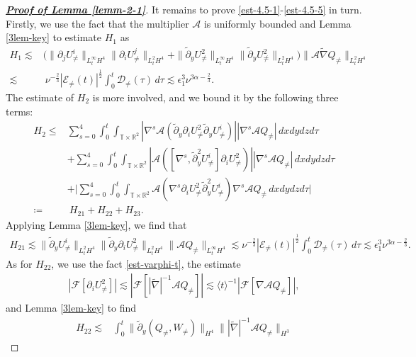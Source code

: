 \documentclass[11pt,reqno]{article}
\numberwithin{equation}{section}
\newcommand\R{{\mathbb R}}
\newcommand\T{{\mathbb T}}
\newcommand\D{{\mathcal D}}
\newcommand\E{{\mathcal E}}
\newcommand\A{\mathcal{A}}
\newcommand \tri {\coloneqq}
\let\pa=\partial
\let\al=\alpha
\let\f=\frac
\let\ep=\epsilon
\begin{document}
\begin{proof}[\underline{\textbf{Proof of Lemma \ref{lemm-2-1}}}]
It remains to prove \eqref{est-4.5-1}-\eqref{est-4.5-5} in turn.
Firstly, we use the fact that the multiplier $\mathcal{A}$ is uniformly bounded and 
Lemma \ref{3lem-key} to estimate $H_1$ as
\begin{align*}
	H_1
	\lesssim &
	\big(\|\pa_{j}U^i_{\not=}\|_{L^\infty_tH^4}
	\|\pa_{i}U^j_{\not=}\|_{L^2_tH^4}
	+\|\tilde{\pa}_yU^2_{\not=}\|_{L^\infty_tH^4}\|\tilde{\pa}_yU^2_{\not=}\|_{L^2_tH^4}\big)
	\|\A\widetilde{\nabla}Q_{\not=}\|_{L^2_tH^4}
	\\
	\lesssim &~\nu^{-\f23} |\E_{\not=}(t)|^{\f12}\int_0^t\D_{\not=}(\tau)\,d\tau
	\lesssim
	\ep_1^3\nu^{3\al-\f23}.
\end{align*}
The estimate of $H_2$ is  more involved, and we bound it by the following three terms:
\begin{align}\label{est-H2-1}
	H_2
	\leq &\sum_{s=0}^{4}
	\int_0^t\int_{\T\times\R^2}	|\nabla^s\A(\tilde{\pa}_y\pa_{i}U_{\not=}^2\tilde{\pa}_yU_{\not=}^i)| 
	|\nabla^s\A Q_{\not=}|\,dxdydzd\tau
	\nonumber
	\\
	&+\sum_{s=0}^{4}
	\int_0^t\int_{\T\times\R^2}
	|\A([\nabla^s,\tilde{\pa}_y^2U_{\not=}^i]\pa_{i}U_{\not=}^2)| 
	|\nabla^s\A Q_{\not=}|\,dxdydzd\tau
	\nonumber
	\\
	&+\Big|\sum_{s=0}^{4}
	\int_0^t\int_{\T\times\R^2}
	\A(\nabla^s\pa_{i}U_{\not=}^2
	\tilde{\pa}_y^2U_{\not=}^i)
	\nabla^s\A Q_{\not=}\,dxdydzd\tau \Big|
	\nonumber
	\\
	\tri&~ H_{21}+H_{22}+H_{23}.
\end{align}
Applying Lemma \ref{3lem-key}, we find that
\begin{align*}
	H_{21}
	\lesssim 
	\|\tilde{\pa}_{y}U^i_{\not=}\|_{L^2_tH^4}
	\|\tilde{\pa}_{y}\pa_{i}U^2_{\not=}\|_{L^2_tH^4}
	\|\A Q_{\not=}\|_{L^{\infty}_tH^4}
	\lesssim \nu^{-\f23} |\E_{\not=}(t)|^{\f12} \int_0^t\D_{\not=}(\tau)\,d\tau
	\lesssim  \ep_1^3\nu^{3\al-\f23}.
\end{align*}
As for $H_{22}$, we use the fact 
\eqref{est-varphi-t}, the
estimate 
\begin{align}\label{est-u2not=-1}
	|\mathcal{F}[\pa_{i}U^2_{\not=}]|
	\lesssim |\mathcal{F}[|\widetilde{\nabla}|^{-1}\A Q_{\not=}]|
	\lesssim \langle t\rangle^{-1}  |\mathcal{F}[\nabla\A Q_{\not=}]|,
\end{align}
and Lemma \ref{3lem-key} to find
\begin{align*}
	H_{22}
	\lesssim& 
	\int_0^t\|\tilde{\pa}_{y} (Q_{\not=},W_{\not=})\|_{H^4}
	\||\widetilde{\nabla}|^{-1} \A Q_{\not=}\|_{H^3}

\end{align*}
\end{proof}
\end{document}

